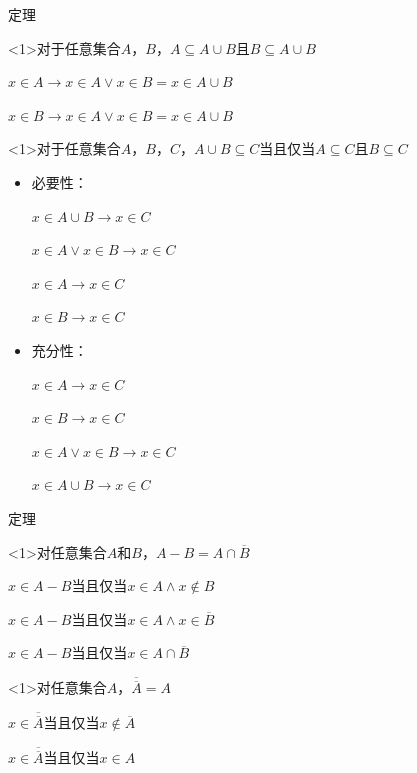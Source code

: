 \documentclass[xetex,10pt,aspectratio=43]{beamer}
\begin{document}
	\begin{frame}{定理}
		
		\begin{block}<1>{对于任意集合$A$，$B$，$A\subseteq A\cup B$且$B\subseteq A\cup B$}
			
			$x\in A\rightarrow x\in A\vee x\in B=x\in A\cup B$
			
			$x\in B\rightarrow x\in A\vee x\in B=x\in A\cup B$
			
		\end{block}
		
		\begin{block}<1>{对于任意集合$A$，$B$，$C$，$A\cup B\subseteq C$当且仅当$A\subseteq C$且$B\subseteq C$}
			
			\begin{itemize}
				
				\item<1>必要性：
				
				$x\in A\cup B\rightarrow x\in C$
				
				$x\in A\vee x\in B\rightarrow x\in C$
				
				$x\in A\rightarrow x\in C$
				
				$x\in B\rightarrow x\in C$
				
				\item<1>充分性：
				
				$x\in A\rightarrow x\in C$
				
				$x\in B\rightarrow x\in C$
				
				$x\in A\vee x\in B\rightarrow x\in C$
				
				$x\in A\cup B\rightarrow x\in C$
			\end{itemize}
			
		\end{block}
		
	\end{frame}

	\begin{frame}{定理}
		
		\begin{block}<1>{对任意集合$A$和$B$，$A-B=A\cap\overline{B}$}
			
			$x\in A-B$当且仅当$x\in A\wedge x\notin B$
			
			$x\in A-B$当且仅当$x\in A\wedge x\in\overline{B}$
			
			$x\in A-B$当且仅当$x\in A\cap\overline{B}$
			
		\end{block}
	
		\begin{block}<1>{对任意集合$A$，$\overline{\overline{A}}=A$}
			
			$x\in \overline{\overline{A}}$当且仅当$x\notin \overline{A}$
			
			$x\in \overline{\overline{A}}$当且仅当$x\in A$
			
		\end{block}
		
	\end{frame}
\end{document}
